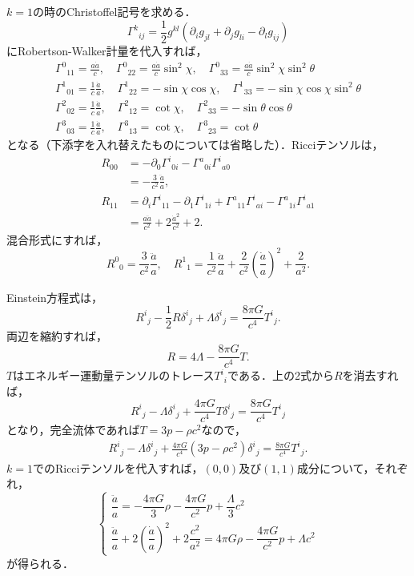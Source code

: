 \documentclass[a4paper]{ltjsreport}
\begin{document}
$k=1$の時のChristoffel記号を求める．
\[{\Gamma^k}_{ij}=\frac{1}{2}g^{kl}\left(\partial_ig_{jl} + \partial_jg_{li} - \partial_lg_{ij}\right)\]
にRobertson-Walker計量を代入すれば，
\begin{align*}
  {\Gamma^0}_{11}=\frac{a\dot{a}}{c}, \quad{\Gamma^0}_{22}=\frac{a\dot{a}}{c}\sin^2\chi, \quad{\Gamma^0}_{33}=\frac{a\dot{a}}{c}\sin^2\chi\sin^2\theta\\
  {\Gamma^1}_{01}=\frac{1}{c}\frac{\dot{a}}{a}, \quad{\Gamma^1}_{22}= - \sin\chi\cos\chi, \quad{\Gamma^1}_{33}= - \sin\chi\cos\chi\sin^2\theta\\
  {\Gamma^2}_{02}=\frac{1}{c}\frac{\dot{a}}{a}, \quad{\Gamma^2}_{12}=\cot\chi, \quad{\Gamma^2}_{33}= - \sin\theta\cos\theta\\
  {\Gamma^3}_{03}=\frac{1}{c}\frac{\dot{a}}{a}, \quad{\Gamma^3}_{13}=\cot\chi, \quad{\Gamma^3}_{23}=\cot\theta
\end{align*}
となる（下添字を入れ替えたものについては省略した）．Ricciテンソルは，
\begin{align*}
  R_{00} &= -  \partial_0{\Gamma^i}_{0i} - {\Gamma^a}_{0i}{\Gamma^i}_{a0}\\
  &= -  \frac{3}{c^2}\frac{\ddot{a}}{a} , \\
  R_{11} &= \partial_i{\Gamma^i}_{11} - \partial_1{\Gamma^i}_{1i} + {\Gamma^a}_{11}{\Gamma^i}_{ai} - {\Gamma^a}_{1i}{\Gamma^i}_{a1}\\
  &= \frac{a\ddot{a}}{c^2} + 2\frac{\dot{a}^2}{c^2} + 2 .
\end{align*}
混合形式にすれば，
\[ {R^0}_0=\frac{3}{c^2}\frac{\ddot{a}}{a}, \quad{R^1}_1=\frac{1}{c^2}\frac{\ddot{a}}{a} + \frac{2}{c^2}\left(\frac{\dot{a}}{a}\right)^2 + \frac{2}{a^2} . \]

Einstein方程式は，
\[ {R^i}_j - \frac{1}{2}R{\delta^i}_j + \Lambda{\delta^i}_j=\frac{8\pi{G}}{c^4}{T^i}_j .\]
両辺を縮約すれば，
\[ R=4\Lambda - \frac{8\pi{G}}{c^4}T . \]
$T$はエネルギー運動量テンソルのトレース${T^i}_i$である．上の2式から$R$を消去すれば，
\[{R^i}_j - \Lambda{\delta^i}_j + \frac{4\pi{G}}{c^4}T{\delta^i}_j=\frac{8\pi{G}}{c^4}{T^i}_j\]
となり，完全流体であれば$T=3p - \rho{c^2}$なので，
\begin{align}
  {R^i}_j - \Lambda{\delta^i}_j + \frac{4\pi{G}}{c^4}\left(3p - \rho{c^2}\right){\delta^i}_j=\frac{8\pi{G}}{c^4}{T^i}_j .
  \label{ein_field_eq}
\end{align}
$k=1$でのRicciテンソルを代入すれば，$(0, 0)$及び$(1, 1)$成分について，それぞれ，
\[
\begin{cases}
  \dfrac{\ddot{a}}{a} = -  \dfrac{4\pi{G}}{3}\rho - \dfrac{4\pi{G}}{c^2}p + \dfrac{\Lambda}{3}c^2 \\[10pt]
  \dfrac{\ddot{a}}{a} + 2\left(\dfrac{\dot{a}}{a}\right)^2 + 2\dfrac{c^2}{a^2}=4\pi{G}\rho - \dfrac{4\pi{G}}{c^2}p + {\Lambda}c^2
\end{cases}
\]
が得られる．
\end{document}
